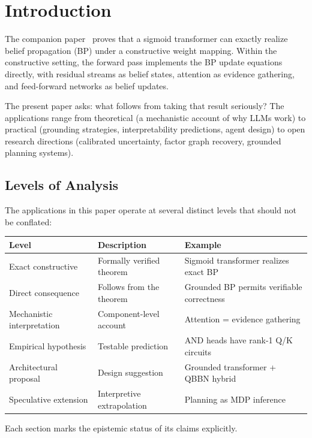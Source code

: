 \section{Introduction}
\label{sec:introduction}

The companion paper~\cite{coppola2026transformers} proves that a sigmoid
transformer can exactly realize belief propagation (BP) under a constructive
weight mapping. Within the constructive setting, the forward pass implements
the BP update equations directly, with residual streams as belief states,
attention as evidence gathering, and feed-forward networks as belief updates.

The present paper asks: what follows from taking that result seriously? The
applications range from theoretical (a mechanistic account of why LLMs work)
to practical (grounding strategies, interpretability predictions, agent design)
to open research directions (calibrated uncertainty, factor graph recovery,
grounded planning systems).

\subsection*{Levels of Analysis}

The applications in this paper operate at several distinct levels that
should not be conflated:

\begin{center}
\begin{tabular}{lll}
\toprule
Level & Description & Example \\
\midrule
Exact constructive & Formally verified theorem & Sigmoid transformer realizes exact BP \\
Direct consequence & Follows from the theorem & Grounded BP permits verifiable correctness \\
Mechanistic interpretation & Component-level account & Attention = evidence gathering \\
Empirical hypothesis & Testable prediction & AND heads have rank-1 Q/K circuits \\
Architectural proposal & Design suggestion & Grounded transformer + QBBN hybrid \\
Speculative extension & Interpretive extrapolation & Planning as MDP inference \\
\bottomrule
\end{tabular}
\end{center}

Each section marks the epistemic status of its claims explicitly.

